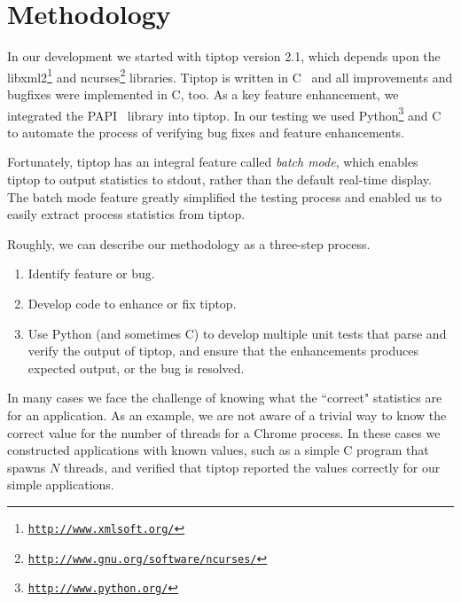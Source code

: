 \section{Methodology}
\label{sec:methodology}
In our development we started with tiptop version 2.1, which depends upon the libxml2\footnote{\texttt{\url{http://www.xmlsoft.org/}}} and ncurses\footnote{\texttt{\url{http://www.gnu.org/software/ncurses/}}} libraries.
Tiptop is written in C~\cite{Kernighan:1988:CPL:576122} and all improvements and bugfixes were implemented in C, too.
As a key feature enhancement, we integrated the PAPI~\cite{Mucci99papi:a} library into tiptop.
In our testing we used Python\footnote{\texttt{\url{http://www.python.org/}}} and C to automate the process of verifying bug fixes and feature enhancements.

Fortunately, tiptop has an integral feature called \emph{batch mode}, which enables tiptop to output statistics to stdout, rather than the default real-time display.
The batch mode feature greatly simplified the testing process and enabled us to easily extract process statistics from tiptop.

Roughly, we can describe our methodology as a three-step process.
\begin{enumerate}
\item Identify feature or bug.
\item Develop code to enhance or fix tiptop.
\item Use Python (and sometimes C) to develop multiple unit tests that parse and verify the output of tiptop, and ensure that the enhancements produces expected output, or the bug is resolved.
\end{enumerate}

In many cases we face the challenge of knowing what the ``correct" statistics are for an application. As an example, we are not aware of a trivial way to know the correct value for the number of threads for a Chrome process.
In these cases we constructed applications with known values, such as a simple C program that spawns $N$ threads, and verified that tiptop reported the values correctly for our simple applications.
